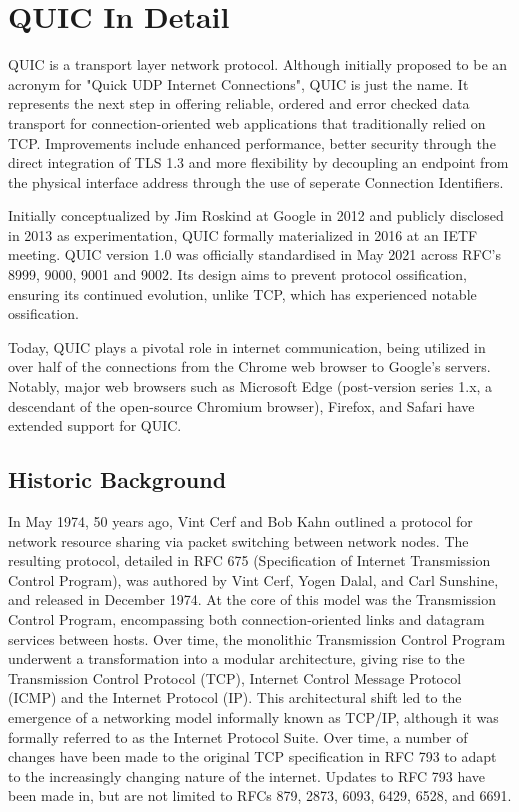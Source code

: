 \chapter{QUIC In Detail}

QUIC is a transport layer network protocol. Although initially proposed to be an acronym for "Quick UDP Internet Connections", QUIC is just the name\cite[10]{rfc9000}. It represents the next step in offering reliable, ordered and error checked data transport for connection-oriented web applications that traditionally relied on TCP. Improvements include enhanced performance, better security through the direct integration of TLS 1.3 and more flexibility by decoupling an endpoint from the physical interface address through the use of seperate Connection Identifiers. 

Initially conceptualized by Jim Roskind at Google in 2012 and publicly disclosed in 2013 as experimentation, QUIC formally materialized in 2016 at an IETF meeting. QUIC version 1.0 was officially standardised in May 2021 across RFC's 8999\cite{rfc8999}, 9000\cite{rfc9000}, 9001\cite{rfc9001} and 9002\cite{rfc9002}. Its design aims to prevent protocol ossification, ensuring its continued evolution, unlike TCP, which has experienced notable ossification.

Today, QUIC plays a pivotal role in internet communication, being utilized in over half of the connections from the Chrome web browser to Google's servers. Notably, major web browsers such as Microsoft Edge (post-version series 1.x, a descendant of the open-source Chromium browser), Firefox, and Safari have extended support for QUIC.

\section{Historic Background}

In May 1974, 50 years ago, Vint Cerf and Bob Kahn outlined a protocol for network resource sharing via packet switching between network nodes. The resulting protocol, detailed in RFC 675 (Specification of Internet Transmission Control Program), was authored by Vint Cerf, Yogen Dalal, and Carl Sunshine, and released in December 1974. At the core of this model was the Transmission Control Program, encompassing both connection-oriented links and datagram services between hosts. Over time, the monolithic Transmission Control Program underwent a transformation into a modular architecture, giving rise to the Transmission Control Protocol (TCP), Internet Control Message Protocol (ICMP) and the Internet Protocol (IP). This architectural shift led to the emergence of a networking model informally known as TCP/IP, although it was formally referred to as the Internet Protocol Suite. Over time, a number of changes have been made to the original TCP specification in RFC 793 to adapt to the increasingly changing nature of the internet. Updates to RFC 793 have been made in, but are not limited to RFCs 879, 2873, 6093, 6429, 6528, and 6691.

